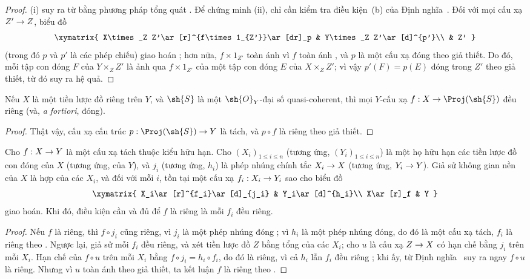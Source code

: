 \documentclass[oneside,10pt]{amsart}
\makeatletter
\renewcommand{\leq}{\leqslant}
\newcommand{\ega@arrow}[2]{\mathchoice{#1}{#2}{#2}{#2}}
\renewcommand{\to}{\ega@arrow{\longrightarrow}{\rightarrow}}
\newcommand{\oldpage}[2][]{\marginnote{\normalfont\footnotesize\textbf{#1}~|~#2}\ignorespaces}
\let\EGAOriginalLabel\label
\renewcommand{\label}[1]{\phantomsection\EGAOriginalLabel{#1}}
\makeatother
\begin{document}
\begin{proof}
(i) suy ra từ  bằng phương pháp tổng quát .
Để chứng minh (ii), chỉ cần kiểm tra điều kiện~(b) của Định nghĩa~.
Đối với mọi cấu xạ $Z'\to Z$, biểu đồ
\[
  \xymatrix{
    X\times_Z Z'\ar[r]^{f\times1_{Z'}}\ar[dr]_p &
    Y\times_Z Z'\ar[d]^{p'}\\
    & Z'
  }
\]
(trong đó $p$ và $p'$ là các phép chiếu) giao hoán ;
hơn nữa, $f\times1_{Z'}$ toàn ánh vì $f$ toàn ánh , và $p$ là một cấu xạ đóng theo giả thiết.
Do đó, mỗi tập con đóng $F$ của $Y\times_Z Z'$ là ảnh qua $f\times1_{Z'}$ của một tập con đóng $E$ của $X\times_Z Z'$; vì vậy $p'(F)=p(E)$ đóng trong $Z'$ theo giả thiết, từ đó suy ra hệ quả.
\end{proof}

\begin{corollary}[5.4.4]
\label{II.5.4.4}
Nếu $X$ là một tiền lược đồ riêng trên $Y$, và $\sh{S}$ là một $\sh{O}_Y$-đại số quasi-coherent, thì mọi $Y$-cấu xạ $f:X\to\Proj(\sh{S})$ đều riêng (và, \emph{a fortiori}, đóng).
\end{corollary}

\begin{proof}
Thật vậy, cấu xạ cấu trúc $p:\Proj(\sh{S})\to Y$ là tách, và $p\circ f$ là riêng theo giả thiết.
\end{proof}

\begin{corollary}[5.4.5]
\label{II.5.4.5}
Cho $f:X\to Y$ là một cấu xạ tách thuộc kiểu hữu hạn.
Cho $(X_i)_{1\leq i\leq n}$ (tương ứng, $(Y_i)_{1\leq i\leq n}$) là một họ hữu hạn các tiền lược đồ con đóng của $X$ (tương ứng, của $Y$), và $j_i$ (tương ứng, $h_i$) là phép nhúng chính tắc $X_i\to X$ (tương ứng, $Y_i\to Y$).
Giả sử không gian nền của $X$ là hợp của các $X_i$, và đối với mỗi $i$, tồn tại một cấu xạ $f_i:X_i\to Y_i$ sao cho biểu đồ
\[
  \xymatrix{
    X_i\ar[r]^{f_i}\ar[d]_{j_i} &
    Y_i\ar[d]^{h_i}\\
    X\ar[r]_f &
    Y
  }
\]
giao hoán.
Khi đó, điều kiện cần và đủ để $f$ là riêng là mỗi $f_i$ đều riêng.
\end{corollary}
\oldpage[II]{102}
\begin{proof}
Nếu $f$ là riêng, thì $f\circ j_i$ cũng riêng, vì $j_i$ là một phép nhúng đóng ;
vì $h_i$ là một phép nhúng đóng, do đó là một cấu xạ tách, $f_i$ là riêng theo .
Ngược lại, giả sử mỗi $f_i$ đều riêng, và xét tiền lược đồ $Z$ bằng tổng của các $X_i$; cho $u$ là cấu xạ $Z\to X$ có hạn chế bằng $j_i$ trên mỗi $X_i$.
Hạn chế của $f\circ u$ trên mỗi $X_i$ bằng $f\circ j_i=h_i\circ f_i$, do đó là riêng, vì cả $h_i$ lẫn $f_i$ đều riêng ;
khi ấy, từ Định nghĩa~ suy ra ngay $f\circ u$ là riêng.
Nhưng vì $u$ toàn ánh theo giả thiết, ta kết luận $f$ là riêng theo .
\end{proof}
\end{document}
